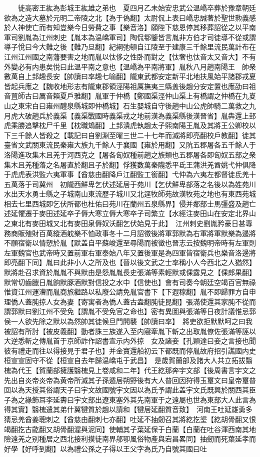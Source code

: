 　　徙高密王紘為彭城王紘雄之弟也　夏四月乙未始安忠武公温嶠卒葬於豫章朝廷欲為之造大墓於元明二帝陵之北【為于偽翻】太尉侃上表曰嶠忠誠著於聖世勲義感於人神使亡而有知豈樂今日勞費之事【樂音洛】願陛下慈恩停其移葬詔從之以平南軍司劉胤為江州刺史【胤本為温嶠軍司】陶侃郗鑒皆言胤非方伯才司徒導不從或謂導子悅曰今大難之後【難乃旦翻】紀綱弛頓自江陵至于建康三千餘里流民萬計布在江州江州國之南藩要害之地而胤以忲侈之性卧而對之【忲奢也忲音太又音大】不有外變必有内患矣悦曰此温平南之意也【温嶠為平南將軍】胤秋八月趙南陽王　帥衆數萬自上邽趣長安【帥讀曰率趣七喻翻】隴東武都安定新平北地扶風始平諸郡戎夏皆起兵應之【魏收地形志有隴東郡領涇陽祖厲撫夷三縣盖後趙分安定置也應劭曰祖音罝師古曰厲音賴夏戶雅翻】胤軍于仲橋【鄭國渠涇仲山渠上有橋謂之仲橋在九嵏山之東宋白曰雍州醴泉縣城即仲橋城】石生嬰城自守後趙中山公虎帥騎二萬救之九月虎大破趙兵於義渠【義渠戰國時義渠戎之地前漢為義渠縣後漢晉省】胤犇還上邽虎乘勝追擊枕尸千里【枕職鴆翻】上邽潰虎執趙太子熙南陽王胤及其將王公卿校以下三千餘人皆殺之【載記曰自劉淵至曜三世二十七年而滅將即亮翻校戶教翻】徙其臺省文武關東流民秦雍大族九千餘人于襄國【雍於用翻】又阬五郡屠各五千餘人于洛陽進攻集木且羌于河西克之【屠各匈奴種前趙之族類也五郡屠各即匈奴五部之衆集木且羌種落之名屠直於翻且子於翻】俘獲數萬秦隴悉平氐王蒲洪羌酋姚弋仲俱降于虎虎表洪監六夷軍事【酋慈由翻降戶江翻監工銜翻】弋仲為六夷左都督徙氐羌十五萬落于司冀州　初隴西鮮卑乞伏述延居于苑川【乞伏鮮卑部落之名後以為姓苑川水出天水勇士縣之子城南山東流歷子城川又北逕牧師苑故漢牧苑之地也有東西苑城相去七里西城即乞伏所都也杜佑曰苑川在蘭州五泉縣界】侵并鄰部士馬彊盛及趙亡述延懼遷于麥田述延卒子傉大寒立傉大寒卒子司繁立【水經注麥田山在安定北界山之東北有麥田城又北有麥田泉傉奴沃翻乞伏始見于此】　江州刺史劉胤矜豪日甚專務商販殖財百萬縱酒躭樂不恤政事冬十二月詔徵後將軍郭默為右軍將軍默樂為邊將不願宿衛以情愬於胤【默盖自平蘇峻還至尋陽而被徵也晉志云按魏明帝時有左軍則左軍魏官也武帝時又置前軍右軍泰始八年又置後軍是為四軍皆宿衛兵也樂音洛邊將即亮翻下同】胤曰此非小人之所及也【晉以後文武之士率稱小人今西北之人猶然】默將赴召求資於胤胤不與默由是怨胤胤長史張滿等素輕默或倮露見之【倮郎果翻】默常切齒臘日胤餉默豚酒默對信投之水中【信使也】會有司奏今朝廷空竭百官無祿惟資江州運漕而胤商旅繼路以私廢公請免胤官書下【下遐稼翻】胤不即歸罪方自申理僑人蓋肫掠人女為妻【寄寓者為僑人蓋古盍翻肫徒昆翻】張滿使還其家肫不從而謂郭默曰劉江州不受免【謂胤不受免官之命也】密有異圖與張滿等日夜計議惟忌郭侯一人欲先除之默以為然帥其徒候旦門開襲【帥讀曰率】　將吏欲拒默默呵之曰我被詔有所討【被皮義翻】動者誅三族遂入至内寢牽胤下斬之出取胤僚佐張滿等誣以大逆悉斬之傳胤首于京師詐作詔書宣示内外掠　女及諸妾【孔穎達曰妾之言接也聞彼有禮走而往以得接見于君子也】并金寶還船初云下都既而停胤故府招引譙國内史桓宣宣固守不從【桓宣自去年歸温嶠屯于武昌】　是歲賀蘭部及諸大人共立拓拔翳槐為代王【賀蘭部擁護翳槐見上卷咸和二年】代王紇那奔宇文部【後周書言宇文之先出自炎帝炎帝為黄帝所滅其子孫遁居朔野後有大人普回因狩得玉璽文曰皇帝璽普回以為天授其俗謂天子曰宇文故國號宇文因以為氏予謂此盖宇文氏既興於關西其臣子為之緣飾耳李延夀曰宇文部出遼東塞外其先南軍于之遠屬也世為東部大人此言為得其實】翳槐遣其弟什翼犍質於趙以請和【犍居延翻質音致】　河南王吐延雄勇多猜忌羌酋姜聰刺之【酋慈由翻刺七亦翻】吐延不抽劒召其將紇扢埿【紇胡骨翻又恨竭翻扢古齕翻又胡骨翻渥與泥同】使輔其子葉延保于白蘭【白蘭在吐谷渾西南其地險遠羌之别種居之西北接利摸徒南界郍卾風俗物產與宕昌畧同】抽劒而死葉延孝而好學【好呼到翻】以為禮公孫之子得以王父字為氏乃自號其國曰吐